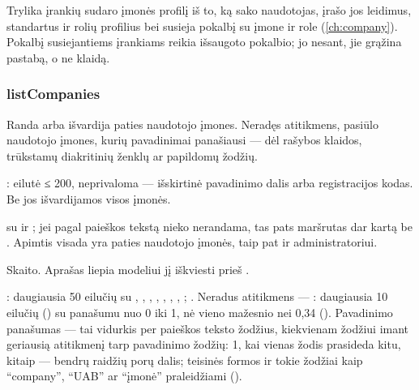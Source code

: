Trylika įrankių sudaro įmonės profilį iš to, ką sako naudotojas, įrašo jos leidimus,
standartus ir rolių profilius bei susieja pokalbį su įmone ir role (\cref{ch:company}).
Pokalbį susiejantiems įrankiams reikia išsaugoto pokalbio; jo nesant, jie grąžina pastabą,
o ne klaidą.

\subsubsection{listCompanies}\label{sec:tools:listCompanies}
\begin{description}[style=multiline, leftmargin=19mm, labelwidth=17mm, labelsep=2mm,
  font=\sffamily\bfseries\footnotesize\color{ink}, itemsep=1pt, topsep=2pt, before=\raggedright]
  \item[Paskirtis] Randa arba išvardija paties naudotojo įmones. Neradęs atitikmens, pasiūlo
    naudotojo įmones, kurių pavadinimai panašiausi --- dėl rašybos klaidos, trūkstamų
    diakritinių ženklų ar papildomų žodžių.
  \item[Įvestis] : eilutė ≤ 200, neprivaloma --- išskirtinė pavadinimo dalis arba
    registracijos kodas. Be jos išvardijamos visos įmonės.
  \item[Užklausos]  su  ir ; jei pagal
    paieškos tekstą nieko nerandama, tas pats maršrutas dar kartą be . Apimtis visada
    yra paties naudotojo įmonės, taip pat ir administratoriui.
  \item[Pobūdis] Skaito. Aprašas liepia modeliui jį iškviesti prieš .
  \item[Grąžina] : daugiausia 50 eilučių su , ,
    , , , ,
    , ; . Neradus atitikmens --- :
    daugiausia 10 eilučių () su panašumu  nuo 0 iki 1, nė
    vieno mažesnio nei 0,34 (). Pavadinimo panašumas --- tai vidurkis per
    paieškos teksto žodžius, kiekvienam žodžiui imant geriausią atitikmenį tarp pavadinimo
    žodžių: 1, kai vienas žodis prasideda kitu, kitaip --- bendrų raidžių porų dalis; teisinės
    formos ir tokie žodžiai kaip \enquote{company}, \enquote{UAB} ar \enquote{įmonė}
    praleidžiami ().
\end{description}

